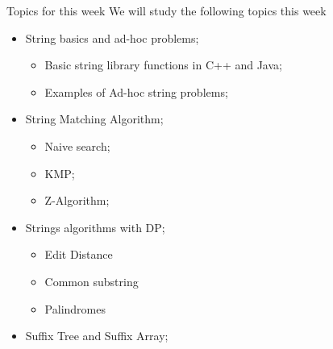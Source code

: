 \begin{frame}{Topics for this week}
  We will study the following topics this week
  \begin{itemize}
    \item String basics and ad-hoc problems;
    \begin{itemize}
      \item Basic string library functions in C++ and Java;
      \item Examples of Ad-hoc string problems;
    \end{itemize}
    \item String Matching Algorithm;
    \begin{itemize}
      \item Naive search;
      \item KMP;
      \item Z-Algorithm;
    \end{itemize}
    \item Strings algorithms with DP;
    \begin{itemize}
      \item Edit Distance
      \item Common substring
      \item Palindromes
    \end{itemize}
    \item Suffix Tree and Suffix Array;
  \end{itemize}
\end{frame}



